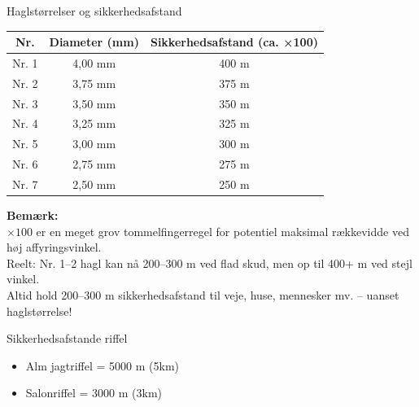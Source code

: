 \begin{frame}{Haglstørrelser og sikkerhedsafstand}
    \begin{center}
        \begin{tabular}{|c|c|c|}
            \hline
            
            \textbf{Nr.} & \textbf{Diameter (mm)} & \textbf{Sikkerhedsafstand (ca. ×100)} \\
            \hline
            Nr. 1 & 4,00 mm & 400 m \\
            Nr. 2 & 3,75 mm & 375 m \\
            Nr. 3 & 3,50 mm & 350 m \\
            Nr. 4 & 3,25 mm & 325 m \\
            Nr. 5 & 3,00 mm & 300 m \\
            Nr. 6 & 2,75 mm & 275 m \\
            Nr. 7 & 2,50 mm & 250 m \\
            \hline
        \end{tabular}
    \end{center}
    
    \vspace{1em}
    \small
    \textbf{Bemærk:} \\
    $\times 100$ er en meget grov tommelfingerregel for potentiel maksimal rækkevidde ved høj affyringsvinkel. \\
    Reelt: Nr. 1–2 hagl kan nå 200–300 m ved flad skud, men op til 400+ m ved stejl vinkel. \\
    Altid hold 200–300 m sikkerhedsafstand til veje, huse, mennesker mv. – uanset haglstørrelse!
\end{frame}

\begin{frame}{Sikkerhedsafstande riffel}
    \begin{itemize}
        \item Alm jagtriffel = 5000 m (5km)
        \item Salonriffel = 3000 m (3km)
    \end{itemize}
\end{frame}